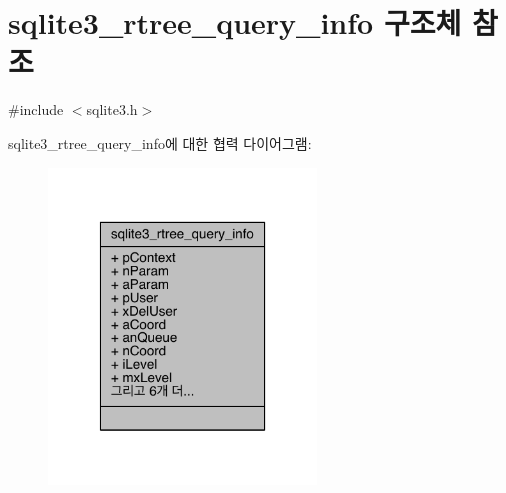 \hypertarget{structsqlite3__rtree__query__info}{}\section{sqlite3\+\_\+rtree\+\_\+query\+\_\+info 구조체 참조}
\label{structsqlite3__rtree__query__info}


{\ttfamily \#include $<$sqlite3.\+h$>$}



sqlite3\+\_\+rtree\+\_\+query\+\_\+info에 대한 협력 다이어그램\+:
\nopagebreak
\begin{figure}[H]
\begin{center}
\leavevmode
\includegraphics[width=202pt]{d2/de4/structsqlite3__rtree__query__info__coll__graph}
\end{center}
\end{figure}
